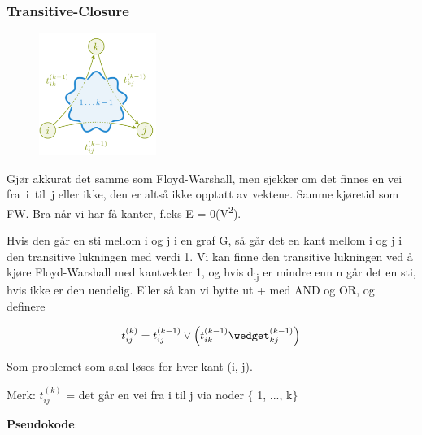 \documentclass[12pt]{report}
\begin{document}
\subsubsection*{Transitive-Closure}



\begin{figure}[H]
\advance\leftskip 5.47in		\includegraphics[width=1.5in,height=1.56in]{./media/image137.png}
\end{figure}



Gjør akkurat det samme som Floyd-Warshall, men sjekker om det finnes en vei fra i til j eller ikke, den er altså ikke opptatt av vektene. Samme kjøretid som FW. Bra når vi har få kanter, f.eks E = 0(V\textsuperscript{2}).\par

Hvis den går en sti mellom i og j i en graf G, så går det en kant mellom i og j i den transitive lukningen med verdi 1. Vi kan finne den transitive lukningen ved å kjøre Floyd-Warshall med kantvekter 1, og hvis d\textsubscript{ij} er mindre enn n går det en sti, hvis ikke er den uendelig. Eller så kan vi bytte ut + med AND og OR, og definere \par

 \[ t_{ij}^{ \left( k \right) }= t_{ij}^{ \left( k-1 \right) } \vee  \left( t_{ik}^{ \left( k-1 \right) }\wedget_{kj}^{ \left( k-1 \right) } \right)   \] \par

Som problemet som skal løses for hver kant (i, j).\par


\vspace{\baselineskip}
Merk:  \( t_{ij}^{ \left( k \right) } \)  = det går en vei fra i til j via noder $ \{ $ 1, ..., k$ \} $ \par


\vspace{\baselineskip}
{\fontsize{13pt}{15.6pt}\selectfont \textbf{Pseudokode}:\par}\par
\end{document}

